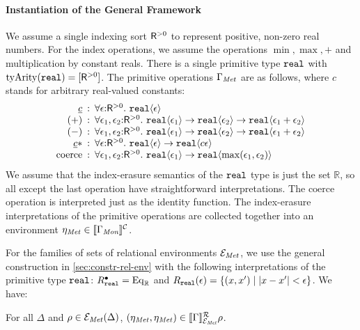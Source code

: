 \paragraph{Instantiation of the General Framework}
We assume a single indexing sort $\mathsf{R}^{>0}$ %
to represent positive, non-zero real numbers. For the index
operations, we assume the operations $\min, \max, +$ and
multiplication by constant reals. There is a single primitive type
$\textup{\texttt{real}}$ with $\mathrm{tyArity}(\textup{\texttt{real}}) =
[\mathsf{R}^{>0}]$. The primitive operations $\Gamma_{\mathit{Met}}$ are as
follows, where $c$ stands for arbitrary real-valued constants:
\begin{displaymath}
  \begin{array}{r@{\hspace{0.5em}:\hspace{0.5em}}l}
    \underline{c} & \forall \epsilon\mathord:\metricSort.\ \tyPrim{real}{\epsilon} \\
    (+) & \forall \epsilon_1, \epsilon_2\mathord:\metricSort.\ \tyPrim{real}{\epsilon_1} \to \tyPrim{real}{\epsilon_2} \to \tyPrim{real}{\epsilon_1 + \epsilon_2} \\
    (-) & \forall \epsilon_1, \epsilon_2\mathord:\metricSort.\ \tyPrim{real}{\epsilon_1} \to \tyPrim{real}{\epsilon_2} \to \tyPrim{real}{\epsilon_1 + \epsilon_2} \\
    \underline{c} * & \forall \epsilon\mathord:\metricSort.\ \tyPrim{real}{\epsilon} \to \tyPrim{real}{c\epsilon} \\
    \mathrm{coerce} & \forall \epsilon_1,\epsilon_2\mathord:\metricSort.\ \tyPrim{real}{\epsilon_1} \to \tyPrim{real}{\max(\epsilon_1,\epsilon_2)}
  \end{array}
\end{displaymath}
We assume that the index-erasure semantics of the $\textup{\texttt{real}}$
type is just the set $\mathbb{R}$, so all except the last operation
have straightforward interpretations. The $\mathrm{coerce}$ operation
is interpreted just as the identity function. The index-erasure
interpretations of the primitive operations are collected together
into an environment $\eta_{\mathit{Met}} \in \llbracket \Gamma_{\textit{Mon}} \rrbracket^{\mathcal{C}}$.

For the families of sets of relational environments
$\mathcal{E}_{\mathit{Met}}$, we use the general construction in
\autoref{sec:constr-rel-env} with the following interpretations of the
primitive type $\textup{\texttt{real}}$: $R^\bullet_{\textup{\texttt{real}}} = \mathrm{Eq}_\mathbb{R}$ and $R_{\textup{\texttt{real}}}(\epsilon) = \{ (x,x') \mathrel| |x - x'| < \epsilon\}$.
We have:
\begin{lemma}
  For all $\Delta$ and $\rho \in \mathcal{E}_{\mathit{Met}}(\Delta)$,
  $(\eta_{\mathit{Met}}, \eta_{\mathit{Met}}) \in
  \llbracket \Gamma \rrbracket^{\mathcal{R}}_{\mathcal{E}_{\mathit{Met}}}{\rho}$.
\end{lemma}


